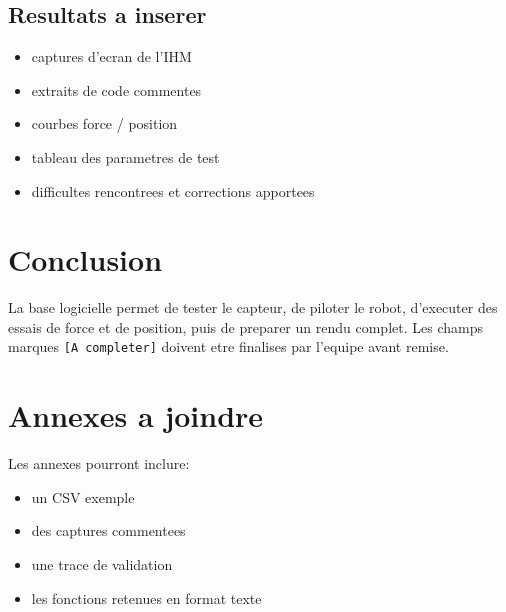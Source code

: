 \documentclass[11pt,a4paper]{article}
\begin{document}
\subsection{Resultats a inserer}

\begin{itemize}
    \item captures d'ecran de l'IHM
    \item extraits de code commentes
    \item courbes force / position
    \item tableau des parametres de test
    \item difficultes rencontrees et corrections apportees
\end{itemize}

\section{Conclusion}

La base logicielle permet de tester le capteur, de piloter le robot, d'executer des essais de force et de position, puis de preparer un rendu complet.
Les champs marques \texttt{[A completer]} doivent etre finalises par l'equipe avant remise.

\appendix
\section{Annexes a joindre}

Les annexes pourront inclure:

\begin{itemize}
    \item un CSV exemple
    \item des captures commentees
    \item une trace de validation
    \item les fonctions retenues en format texte
\end{itemize}
\end{document}
